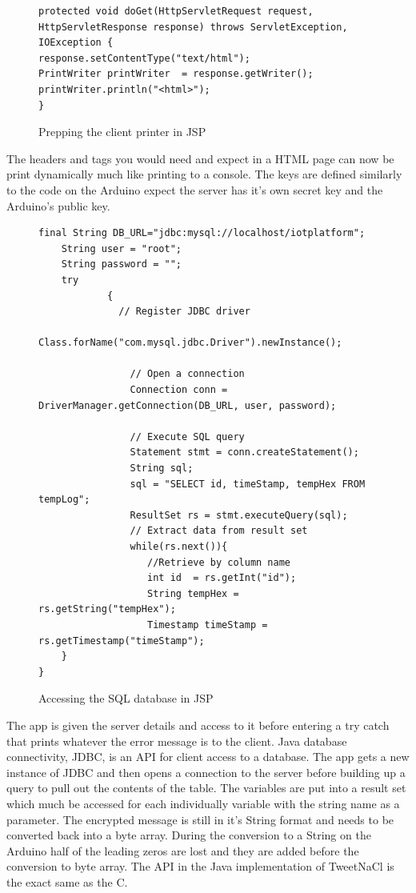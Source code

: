 \begin{figure}[H]
\begin{lstlisting}[style=Java]
protected void doGet(HttpServletRequest request, HttpServletResponse response) throws ServletException, IOException {
response.setContentType("text/html");
PrintWriter printWriter  = response.getWriter();
printWriter.println("<html>");
}
\end{lstlisting}
\caption{Prepping the client printer in JSP}
\label{snip:clientprinterjsp}
\end{figure}

The headers and tags you would need and expect in a HTML page can now be print dynamically much like printing to a console. The keys are defined similarly  to the code on the Arduino expect the server has it's own secret key and the Arduino's public key.

\begin{figure}[H]
\begin{lstlisting}[style=Java]
	final String DB_URL="jdbc:mysql://localhost/iotplatform";
	String user = "root"; 
	String password = "";
	try
	        {
	          // Register JDBC driver
	          Class.forName("com.mysql.jdbc.Driver").newInstance();

	            // Open a connection
	            Connection conn = DriverManager.getConnection(DB_URL, user, password);

	            // Execute SQL query
	            Statement stmt = conn.createStatement();
	            String sql;
	            sql = "SELECT id, timeStamp, tempHex FROM tempLog";
	            ResultSet rs = stmt.executeQuery(sql);
	            // Extract data from result set
	            while(rs.next()){
	               //Retrieve by column name
	               int id  = rs.getInt("id");
	               String tempHex = rs.getString("tempHex");
	               Timestamp timeStamp = rs.getTimestamp("timeStamp");
	}
}
\end{lstlisting}
\caption{Accessing the SQL database in JSP}
\label{snip:sqlaccessjsp}
\end{figure}

The app is given the server details and access to it before entering a try catch that prints whatever the error message is to the client. Java database connectivity, JDBC, is an API for client access to a database. The app gets a new instance of JDBC and then opens a connection to the server before building up a query to pull out the contents of the table. The variables are put into a result set which much be accessed for each individually variable with the string name as a parameter. The encrypted message is still in it's String format and needs to be converted back into a byte array. During the conversion to a String on the Arduino half of the leading zeros are lost and they are added before the conversion to byte array. The API in the Java implementation of TweetNaCl is the exact same as the C.

